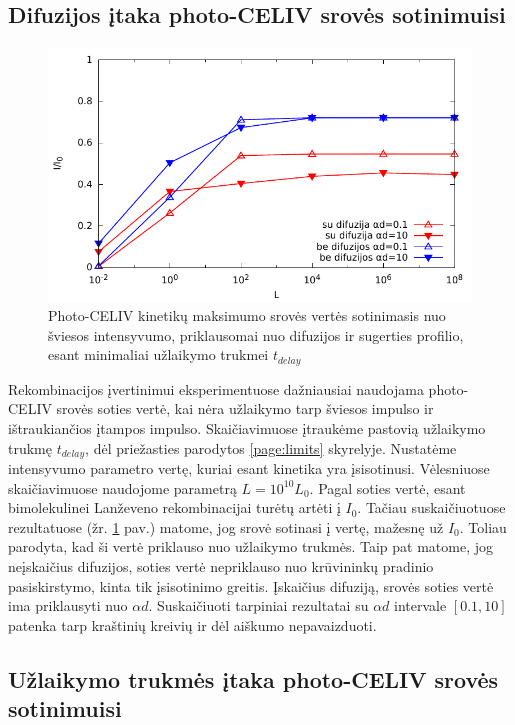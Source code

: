 \subsection{Difuzijos įtaka photo-CELIV srovės sotinimuisi}
\label{page:saturation}
\begin{figure}[H]
  \centering
    \includegraphics{./media/pdf/semilogsaturation.pdf}
  \caption{Photo-CELIV kinetikų maksimumo srovės vertės sotinimasis nuo šviesos intensyvumo, priklausomai nuo difuzijos ir sugerties profilio, esant minimaliai užlaikymo trukmei $t_{delay}$}
  \label{fig:saturation}
\end{figure}

Rekombinacijos įvertinimui eksperimentuose dažniausiai naudojama photo-CELIV srovės soties vertė, kai nėra užlaikymo tarp šviesos impulso ir ištraukiančios įtampos impulso. Skaičiavimuose įtraukėme pastovią užlaikymo trukmę $t_{delay}$, dėl priežasties parodytos \ref{page:limits} skyrelyje. Nustatėme intensyvumo parametro vertę, kuriai esant kinetika yra įsisotinusi. Vėlesniuose skaičiavimuose naudojome parametrą $L=10^{10} L_0$. Pagal \cite{juška:155202} soties vertė, esant bimolekulinei Lanževeno rekombinacijai turėtų artėti į $I_0$. Tačiau suskaičiuotuose rezultatuose (žr. \ref{fig:saturation} pav.) matome, jog srovė sotinasi į vertę, mažesnę už $I_0$. Toliau parodyta, kad ši vertė priklauso nuo užlaikymo trukmės.
Taip pat matome, jog neįskaičius difuzijos, soties vertė nepriklauso nuo krūvininkų pradinio pasiskirstymo, kinta tik įsisotinimo greitis.
Įskaičius difuziją, srovės soties vertė ima priklausyti nuo $\alpha d$.
Suskaičiuoti tarpiniai rezultatai su $\alpha d$ intervale $[0.1 , 10]$ patenka tarp kraštinių kreivių ir dėl aiškumo nepavaizduoti.

\subsection{Užlaikymo trukmės įtaka photo-CELIV srovės sotinimuisi}

